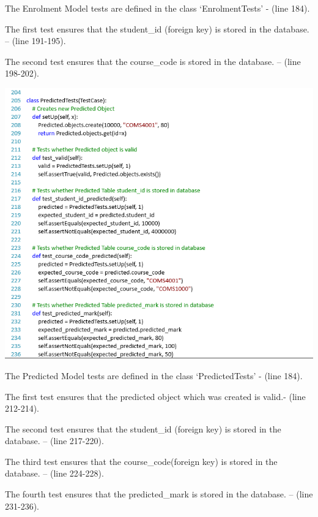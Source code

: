 \documentclass[10pt]{article}
\begin{document}
\begin{description}[font=$\bullet$~\normalfont\scshape\color{red!50!black}]

\item [] The Enrolment Model tests are defined in the class ‘EnrolmentTests’ - (line 184).
\item [] The first test ensures that the student\_id (foreign key) is stored in the database. – (line 191-195).
\item [] The second test ensures that the course\_code is stored in the database. – (line 198-202).

\end{description}

\begin{center}
\includegraphics[width=.9\textwidth]{pc3.png}
\end{center}

\begin{description}[font=$\bullet$~\normalfont\scshape\color{red!50!black}]

\item [] The Predicted Model tests are defined in the class ‘PredictedTests’ - (line 184).
\item [] The first test ensures that the predicted object which was created is valid.- (line 212-214).
\item [] The second test ensures that the student\_id (foreign key) is stored in the database. – (line 217-220).
\item [] The third test ensures that the course\_code(foreign key) is stored in the database. – (line 224-228).
\item [] The fourth test ensures that the predicted\_mark is stored in the database. – (line 231-236).

\end{description}
\end{document}
